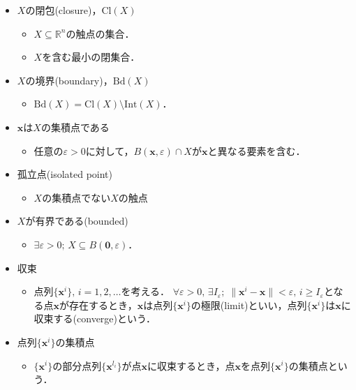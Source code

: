 \documentclass{jsreport}
\begin{document}
\begin{itemize}
\begin{itemize}
  \end{itemize}
  \item $X$の閉包(closure)，$\mathrm{Cl}(X)$
  \begin{itemize}
    \item $X \subseteq \mathbb{R}^n$の触点の集合．
    \item $X$を含む最小の閉集合．
  \end{itemize}
  \item $X$の境界(boundary)，$\mathrm{Bd}(X)$
  \begin{itemize}
    \item $\mathrm{Bd}(X) = \mathrm{Cl}(X) \setminus \mathrm{Int}(X)$．
  \end{itemize}
  \item $\bm{x}$は$X$の集積点である
  \begin{itemize}
    \item 任意の$\varepsilon > 0$に対して，$B(\bm{x}, \varepsilon) \cap X$が$\bm{x}$と異なる要素を含む．
  \end{itemize}
  \item 孤立点(isolated point)
  \begin{itemize}
    \item $X$の集積点でない$X$の触点
  \end{itemize}
  \item $X$が有界である(bounded)
  \begin{itemize}
    \item $\exists \varepsilon > 0; \, X \subseteq B(\bm{0}, \varepsilon)$．
  \end{itemize}
  \item 収束
  \begin{itemize}
    \item 点列$\{\bm{x}^i\}, \, i = 1, 2, \ldots$を考える．
    $\forall \varepsilon > 0, \, \exists I_{\varepsilon}; \; \|\bm{x}^i - \bm{x}\| < \varepsilon, \, i \geq I_{\varepsilon}$となる点$\bm{x}$が存在するとき，$\bm{x}$は点列$\{\bm{x}^i\}$の極限(limit)といい，点列$\{\bm{x}^i\}$は$\bm{x}$に収束する(converge)という．
  \end{itemize}
  \item 点列$\{\bm{x}^i\}$の集積点
  \begin{itemize}
    \item $\{\bm{x}^i\}$の部分点列$\{\bm{x}^{l_i}\}$が点$\bm{x}$に収束するとき，点$\bm{x}$を点列$\{\bm{x}^i\}$の集積点という．
  \end{itemize}
\end{itemize}
\end{document}
